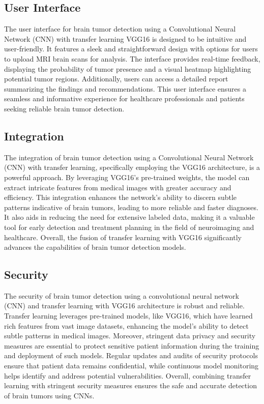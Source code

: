\subsection{User Interface}
The user interface for brain tumor detection using a Convolutional Neural Network (CNN) with transfer learning VGG16 is designed to be intuitive and user-friendly. It features a sleek and straightforward design with options for users to upload MRI brain scans for analysis. The interface provides real-time feedback, displaying the probability of tumor presence and a visual heatmap highlighting potential tumor regions. Additionally, users can access a detailed report summarizing the findings and recommendations. This user interface ensures a seamless and informative experience for healthcare professionals and patients seeking reliable brain tumor detection.

\subsection{Integration}
The integration of brain tumor detection using a Convolutional Neural Network (CNN) with transfer learning, specifically employing the VGG16 architecture, is a powerful approach. By leveraging VGG16's pre-trained weights, the model can extract intricate features from medical images with greater accuracy and efficiency. This integration enhances the network's ability to discern subtle patterns indicative of brain tumors, leading to more reliable and faster diagnoses. It also aids in reducing the need for extensive labeled data, making it a valuable tool for early detection and treatment planning in the field of neuroimaging and healthcare. Overall, the fusion of transfer learning with VGG16 significantly advances the capabilities of brain tumor detection models.
 
\subsection{Security}
The security of brain tumor detection using a convolutional neural network (CNN) and transfer learning with VGG16 architecture is robust and reliable. Transfer learning leverages pre-trained models, like VGG16, which have learned rich features from vast image datasets, enhancing the model's ability to detect subtle patterns in medical images. Moreover, stringent data privacy and security measures are essential to protect sensitive patient information during the training and deployment of such models. Regular updates and audits of security protocols ensure that patient data remains confidential, while continuous model monitoring helps identify and address potential vulnerabilities. Overall, combining transfer learning with stringent security measures ensures the safe and accurate detection of brain tumors using CNNs.

